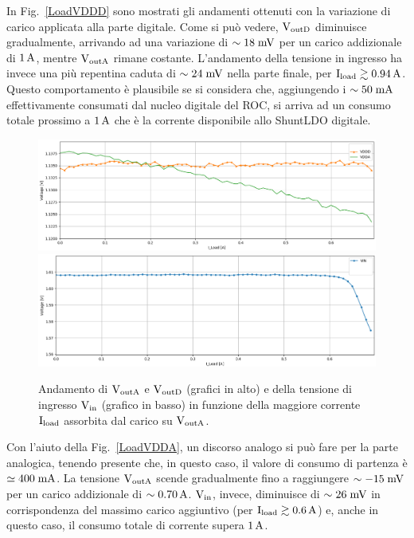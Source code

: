 In Fig.~\ref{LoadVDDD} sono mostrati gli andamenti ottenuti con la variazione di carico applicata alla parte digitale. Come si può vedere, $\mathrm{V_{outD}}$ diminuisce gradualmente, arrivando ad una variazione di $\sim 18\rm \; mV$ per un carico addizionale di $1\rm \, A$, mentre $\mathrm{V_{outA}}$ rimane costante. %
L'andamento della tensione in ingresso ha invece una pi\`u repentina caduta di $\sim 24\rm \; mV$ nella parte finale, per $\mathrm{I_{load}} \gtrsim 0.94\rm \, A$. Questo comportamento è plausibile se si considera che, aggiungendo i $\sim 50\rm \; mA$ effettivamente consumati dal nucleo digitale del ROC, si arriva ad un consumo totale prossimo a $1\rm \, A$ che \`e la corrente disponibile allo ShuntLDO digitale.
\begin{figure}
\centering
\includegraphics[width=\textwidth]{Immagini/LoadVDDA}
\includegraphics[width=\textwidth]{Immagini/LoadVINA}
\caption{Andamento di $\mathrm{V_{outA}}$ e $\mathrm{V_{outD}}$ (grafici in alto) e della tensione di ingresso $\mathrm{V_{in}}$ (grafico in basso) in funzione della maggiore corrente $\mathrm{I_{load}}$ assorbita dal carico su $\mathrm{V_{outA}}$.}
\label{LoadVDDA}
\label{LoadVINA}
\end{figure}
Con l'aiuto della Fig.~\ref{LoadVDDA}, un discorso analogo si può fare per la parte analogica, tenendo presente che, in questo caso, il valore di consumo di partenza \`e $\simeq 400\rm \; mA$.
La tensione $\mathrm{V_{outA}}$ scende gradualmente fino a raggiungere $\sim -15\rm \; mV$ per un carico addizionale di $\sim 0.70\rm \, A$. $\mathrm{V_{in}}$, invece, diminuisce di $\sim 26\rm \; mV$ in corrispondenza del massimo carico aggiuntivo (per $\mathrm{I_{load}} \gtrsim 0.6\rm \, A$) e, anche in questo caso, il consumo totale di corrente supera $1\rm \, A$. 

